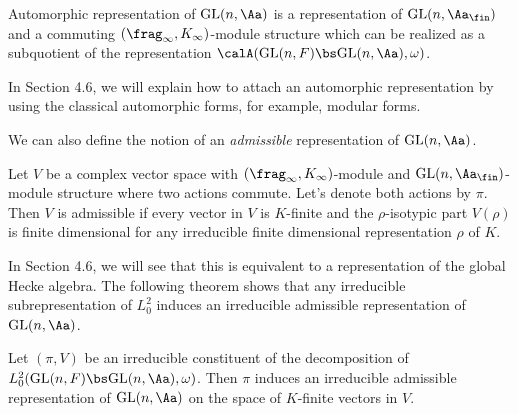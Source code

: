 \begin{definition}
Automorphic representation of $\GL(n, \Aa)$ is a representation of $\GL(n, \Aa_{\fin})$ and a commuting $(\frag_{\infty}, K_{\infty})$-module structure which can be realized as a subquotient of the representation $\calA(\GL(n, F)\bs \GL(n, \Aa), \omega)$. 
\end{definition}
In Section 4.6, we will explain how to attach an automorphic representation by using the classical automorphic forms, for example, modular forms. 

We can also define the notion of an \emph{admissible} representation of $\GL(n, \Aa)$. 
\begin{definition}
Let $V$ be a complex vector space with $(\frag_{\infty}, K_{\infty})$-module and $\GL(n, \Aa_{\fin})$-module structure where two actions commute. 
Let's denote both actions by $\pi$. 
Then $V$ is admissible if every vector in $V$ is $K$-finite and the $\rho$-isotypic part $V(\rho)$ is finite dimensional for any irreducible finite dimensional representation $\rho$ of $K$. 
\end{definition}
In Section 4.6,  we will see that this is equivalent to a representation of the global Hecke algebra.
The following theorem shows that any irreducible subrepresentation of $L_{0}^{2}$ induces an irreducible admissible representation of $\GL(n, \Aa)$. 
\begin{theorem}
\label{l2autoad}
Let $(\pi, V)$ be an irreducible constituent of the decomposition of $L^{2}_{0}(\GL(n, F)\bs \GL(n, \Aa), \omega)$.
Then $\pi$ induces an irreducible admissible representation of $\GL(n, \Aa)$ on the space of $K$-finite vectors in $V$. 
\end{theorem}

